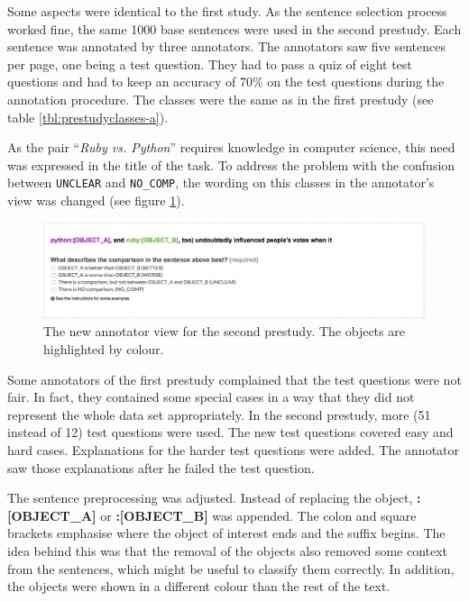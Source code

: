 Some aspects were identical to the first study. As the sentence selection process worked fine, the same 1000 base sentences were used in the second prestudy.  Each sentence was annotated by three annotators. The annotators saw five sentences per page, one being a test question. They had to pass a quiz of eight test questions and had to keep an accuracy of 70\% on the test questions during the annotation procedure. The classes were the same as in the first prestudy (see table \ref{tbl:prestudyclasses-a}).

As the pair \enquote{\emph{Ruby vs. Python}} requires knowledge in computer science, this need was expressed in the title of the task.
To address the problem with the confusion between \texttt{UNCLEAR} and \texttt{NO\_COMP}, the wording on this classes in the annotator's view was changed (see figure \ref{img:2_question}). 

\begin{figure}[htb]
\centering
\includegraphics[width=1\textwidth]{images/prestudy/2_question}

\caption{The new annotator view for the second prestudy. The objects are highlighted by colour.}
\label{img:2_question}
\end{figure}

Some annotators of the first prestudy complained that the test questions were not fair. In fact, they contained some special cases in a way that they did not represent the whole data set appropriately. In the second prestudy, more (51 instead of 12) test questions were used. The new test questions covered easy and hard cases. Explanations for the harder test questions were added. The annotator saw those explanations after he failed the test question.



The sentence preprocessing was adjusted. Instead of replacing the object, \mbox{\textbf{{\color[HTML]{9A14B2}:{[}OBJECT\_A{]}}}} or \textbf{{\color[HTML]{6CB219}:{[}OBJECT\_B{]}}} was appended. The colon and square brackets emphasise where the object of interest ends and the suffix begins. The idea behind this was that the removal of the objects also removed some context from the sentences, which might be useful to classify them correctly. In addition, the objects were shown in a different colour than the rest of the text.\newline



